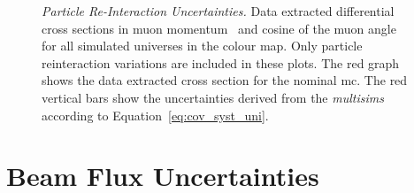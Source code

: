\begin{figure}[t]
\centering
{}
\caption[Particle Re-Interaction Uncertainties - Universes Distributions]{\emph{Particle Re-Interaction Uncertainties.} 
Data extracted differential cross sections in muon momentum~\protect{} and cosine of the muon angle~\protect{} for all simulated universes in the colour map. Only particle reinteraction variations are included in these plots. The red graph shows the data extracted cross section for the nominal \acrshort{mc}. The red vertical bars show the uncertainties derived from the \emph{multisims} according to Equation~\eqref{eq:cov_syst_uni}.}
\label{fig:reinteraction_multisim}
\end{figure}




\clearpage
\section{Beam Flux Uncertainties}
\label{sec:error_flux}

